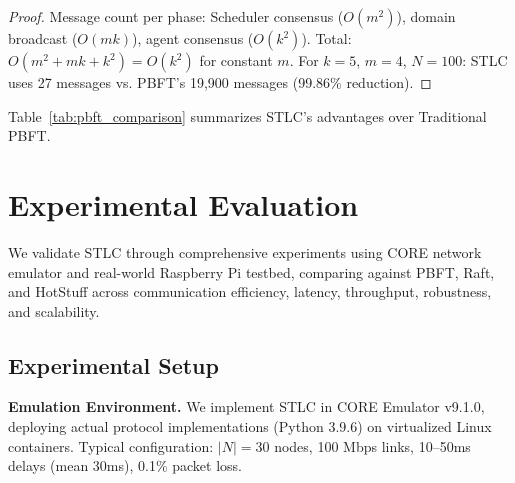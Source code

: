 \documentclass[lettersize,journal]{IEEEtran}
\begin{document}
\begin{proof}
Message count per phase: Scheduler consensus ($O(m^2)$), domain broadcast
($O(mk)$), agent consensus ($O(k^2)$). Total:
$O(m^2 + mk + k^2) = O(k^2)$ for constant $m$. For $k=5$, $m=4$, $N=100$:
STLC uses 27 messages vs. PBFT's 19,900 messages (99.86\% reduction).
\end{proof}

Table~\ref{tab:pbft_comparison} summarizes STLC's advantages over Traditional PBFT.

\begin{table}[h]
\centering
\caption{STLC vs. Traditional PBFT}
\label{tab:pbft_comparison}
\small
{}
\end{table}

\section{Experimental Evaluation}
\label{sec:evaluation}

We validate STLC through comprehensive experiments using CORE network 
emulator and real-world Raspberry Pi testbed, comparing against PBFT, 
Raft, and HotStuff across communication efficiency, latency, throughput, 
robustness, and scalability.

\subsection{Experimental Setup}

\textbf{Emulation Environment.} We implement STLC in CORE Emulator v9.1.0, 
deploying actual protocol implementations (Python 3.9.6) on virtualized 
Linux containers. Typical configuration: $|N|=30$ nodes, 100 Mbps links, 10--50ms delays (mean 30ms), 0.1\% packet loss.
\end{document}
